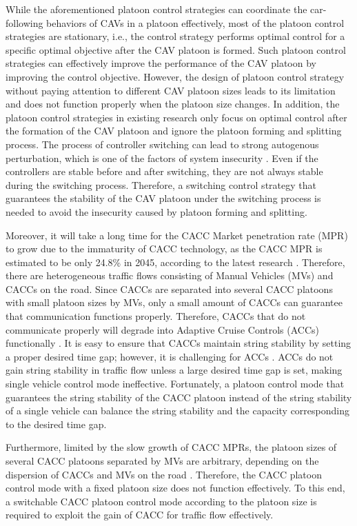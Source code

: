 \documentclass[journal]{IEEEtran}
\begin{document}
While the aforementioned platoon control strategies can coordinate the car-following behaviors of CAVs in a platoon effectively, most of the platoon control strategies are stationary, i.e., the control strategy performs optimal control for a specific optimal objective after the CAV platoon is formed. Such platoon control strategies can effectively improve the performance of the CAV platoon by improving the control objective. However, the design of platoon control strategy without paying attention to different CAV platoon sizes leads to its limitation and does not function properly when the platoon size changes. In addition, the platoon control strategies in existing research only focus on optimal control after the formation of the CAV platoon and ignore the platoon forming and splitting process. The process of controller switching can lead to strong autogenous perturbation, which is one of the factors of system insecurity \citep{Stefanovic2008}. Even if the controllers are stable before and after switching, they are not always stable during the switching process. Therefore, a switching control strategy that guarantees the stability of the CAV platoon under the switching process is needed to avoid the insecurity caused by platoon forming and splitting.


Moreover, it will take a long time for the CACC Market penetration rate (MPR) to grow due to the immaturity of CACC technology, as the CACC MPR is estimated to be only 24.8\% in 2045, according to the latest research \citep{Bansal2017}. Therefore, there are heterogeneous traffic flows consisting of Manual Vehicles (MVs) and CACCs on the road. Since CACCs are separated into several CACC platoons with small platoon sizes by MVs, only a small amount of CACCs can guarantee that communication functions properly. Therefore, CACCs that do not communicate properly will degrade into Adaptive Cruise Controls (ACCs) functionally \citep{ruanImpactsInformationFlow2022,Yao2021}. It is easy to ensure that CACCs maintain string stability by setting a proper desired time gap; however, it is challenging for ACCs \citep{Montanino2021a,Shang2021,marsden2001towards}. ACCs do not gain string stability in traffic flow unless a large desired time gap is set, making single vehicle control mode ineffective. Fortunately, a platoon control mode that guarantees the string stability of the CACC platoon instead of the string stability of a single vehicle can balance the string stability and the capacity corresponding to the desired time gap.

Furthermore, limited by the slow growth of CACC MPRs, the platoon sizes of several CACC platoons separated by MVs are arbitrary, depending on the dispersion of CACCs and MVs on the road \citep{zhou2020stabilizing}. Therefore, the CACC platoon control mode with a fixed platoon size does not function effectively. To this end, a switchable CACC platoon control mode according to the platoon size is required to exploit the gain of CACC for traffic flow effectively.
\end{document}
